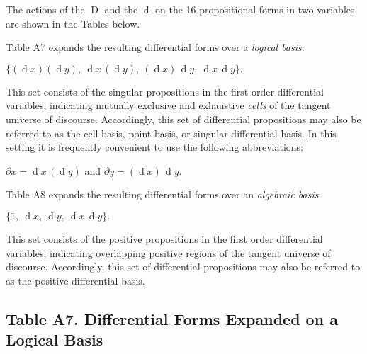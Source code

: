 \documentclass[12pt]{article}
\begin{document}

The actions of the  $\operatorname{D}$ and the  $\operatorname{d}$ on the 16 propositional forms in two variables are shown in the Tables below.

Table A7 expands the resulting differential forms over a \textit{logical basis}:

\begin{center}
$\{ (\operatorname{d}x)(\operatorname{d}y),\ \operatorname{d}x\,(\operatorname{d}y),\ (\operatorname{d}x)\,\operatorname{d}y,\ \operatorname{d}x\,\operatorname{d}y \}.$
\end{center}

This set consists of the singular propositions in the first order differential variables, indicating mutually exclusive and exhaustive \textit{cells} of the tangent universe of discourse.  Accordingly, this set of differential propositions may also be referred to as the cell-basis, point-basis, or singular differential basis.  In this setting it is frequently convenient to use the following abbreviations:

\begin{center}
$\partial x = \operatorname{d}x\,(\operatorname{d}y)$ and $\partial y = (\operatorname{d}x)\,\operatorname{d}y.$
\end{center}

Table A8 expands the resulting differential forms over an \textit{algebraic basis}:

\begin{center}
$\{ 1,\ \operatorname{d}x,\ \operatorname{d}y,\ \operatorname{d}x\,\operatorname{d}y \}.$
\end{center}

This set consists of the positive propositions in the first order differential variables, indicating overlapping positive regions of the tangent universe of discourse.  Accordingly, this set of differential propositions may also be referred to as the positive differential basis.

\tableofcontents

\subsection{Table A7.  Differential Forms Expanded on a Logical Basis}
\end{document}
